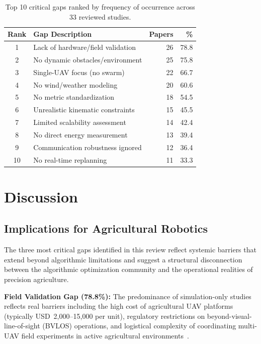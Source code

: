 \documentclass[review,3p,times]{elsarticle}
\begin{document}
\begin{table}[htbp]
\centering
\caption{Top 10 critical gaps ranked by frequency of occurrence across 33 reviewed studies.}
\label{tab:top10}
\begin{tabular}{clrr}
\toprule
\textbf{Rank} & \textbf{Gap Description} & \textbf{Papers} & \textbf{\%} \\
\midrule
1 & Lack of hardware/field validation & 26 & 78.8 \\
2 & No dynamic obstacles/environment & 25 & 75.8 \\
3 & Single-UAV focus (no swarm) & 22 & 66.7 \\
4 & No wind/weather modeling & 20 & 60.6 \\
5 & No metric standardization & 18 & 54.5 \\
6 & Unrealistic kinematic constraints & 15 & 45.5 \\
7 & Limited scalability assessment & 14 & 42.4 \\
8 & No direct energy measurement & 13 & 39.4 \\
9 & Communication robustness ignored & 12 & 36.4 \\
10 & No real-time replanning & 11 & 33.3 \\
\bottomrule
\end{tabular}
\end{table}

\section{Discussion}

\subsection{Implications for Agricultural Robotics}
The three most critical gaps identified in this review reflect systemic barriers that extend beyond algorithmic limitations and suggest a structural disconnection between the algorithmic optimization community and the operational realities of precision agriculture.

\textbf{Field Validation Gap (78.8\%):} The predominance of simulation-only studies reflects real barriers including the high cost of agricultural UAV platforms (typically USD~2,000--15,000 per unit), regulatory restrictions on beyond-visual-line-of-sight (BVLOS) operations, and logistical complexity of coordinating multi-UAV field experiments in active agricultural environments~\cite{phung2021}.
\end{document}
